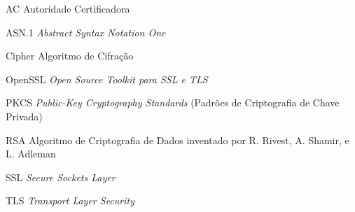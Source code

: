 \begin{siglas}
  \item[AC] Autoridade Certificadora
  \item[ASN.1] \textit{Abstract Syntax Notation One}
  \item[Cipher] Algoritmo de Cifração
  \item[OpenSSL] \textit{Open Source Toolkit para SSL e TLS}
  \item[PKCS] \textit{Public-Key Cryptography Standards} (Padrões de Criptografia de Chave Privada)
  \item[RSA] Algoritmo de Criptografia de Dados inventado por R. Rivest, A. Shamir, e L. Adleman
  \item[SSL] \textit{Secure Sockets Layer}
  \item[TLS] \textit{Transport Layer Security}
\end{siglas}
